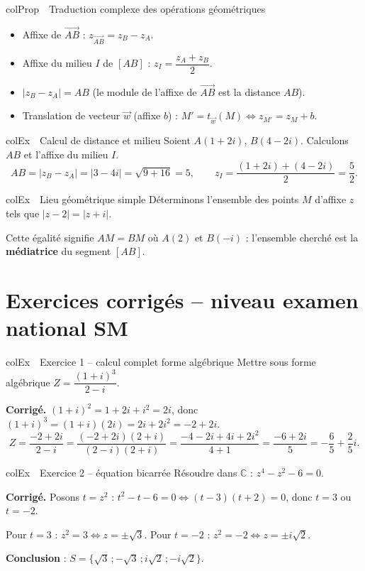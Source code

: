 \documentclass[11pt,a4paper]{article}
\newenvironment{propriete}[1][Propriété]
  {\begin{fiche}{colProp}{\ding{72}~~#1}}{\end{fiche}}
\newenvironment{exemple}[1][Exemple]
  {\begin{fiche}{colEx}{\ding{217}~~#1}}{\end{fiche}}
\begin{document}
\begin{propriete}[Traduction complexe des opérations géométriques]
\begin{itemize}[leftmargin=6mm, itemsep=0.5mm]
  \item Affixe de $\overrightarrow{AB}$ : $z_{\overrightarrow{AB}} = z_B-z_A$.
  \item Affixe du milieu $I$ de $[AB]$ : $z_I=\dfrac{z_A+z_B}{2}$.
  \item $|z_B-z_A| = AB$ (le module de l'affixe de $\overrightarrow{AB}$ est la distance $AB$).
  \item Translation de vecteur $\vec w$ (affixe $b$) : $M'=t_{\vec w}(M) \iff z_{M'}=z_M+b$.
\end{itemize}
\end{propriete}

\begin{exemple}[Calcul de distance et milieu]
Soient $A(1+2i)$, $B(4-2i)$. Calculons $AB$ et l'affixe du milieu $I$.
\[
  AB = |z_B-z_A| = |3-4i| = \sqrt{9+16}=5, \qquad
  z_I = \frac{(1+2i)+(4-2i)}{2} = \frac52.
\]
\end{exemple}

\begin{exemple}[Lieu géométrique simple]
Déterminons l'ensemble des points $M$ d'affixe $z$ tels que $|z-2|=|z+i|$.

\smallskip
Cette égalité signifie $AM=BM$ où $A(2)$ et $B(-i)$ : l'ensemble cherché est la \textbf{médiatrice} du segment $[AB]$.
\end{exemple}

\section{Exercices corrigés -- niveau examen national SM}

\begin{exemple}[Exercice 1 -- calcul complet forme algébrique]
Mettre sous forme algébrique $Z=\dfrac{(1+i)^3}{2-i}$.

\smallskip
\textbf{Corrigé.} $(1+i)^2=1+2i+i^2=2i$, donc $(1+i)^3=(1+i)(2i)=2i+2i^2=-2+2i$.
\[
  Z = \frac{-2+2i}{2-i} = \frac{(-2+2i)(2+i)}{(2-i)(2+i)} = \frac{-4-2i+4i+2i^2}{4+1} = \frac{-6+2i}{5} = -\frac65+\frac25i.
\]
\end{exemple}

\begin{exemple}[Exercice 2 -- équation bicarrée]
Résoudre dans $\mathbb{C}$ : $z^4-z^2-6=0$.

\smallskip
\textbf{Corrigé.} Posons $t=z^2$ : $t^2-t-6=0 \iff (t-3)(t+2)=0$, donc $t=3$ ou $t=-2$.

\smallskip
Pour $t=3$ : $z^2=3\iff z=\pm\sqrt3$. Pour $t=-2$ : $z^2=-2\iff z=\pm i\sqrt2$.

\smallskip
\textbf{Conclusion} : $S=\{\sqrt3\,;-\sqrt3\,;i\sqrt2\,;-i\sqrt2\}$.
\end{exemple}
\end{document}
